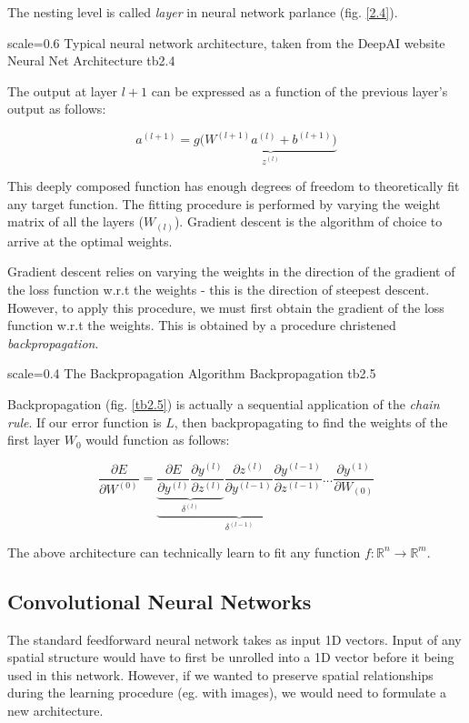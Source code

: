 The nesting level is called \emph{layer} in neural network parlance (fig. \ref{2.4}). 

{scale=0.6}%
{Typical neural network architecture, taken from the DeepAI website}%
{Neural Net Architecture}%
{tb2.4} %

The output at layer $l+1$ can be expressed as a function of the previous layer's output as follows:

\[a^{(l+1)} = g(\underbrace{W^{(l+1)}a^{(l)} + b^{(l+1)})}_{z^{(l)}}\]

This deeply composed function has enough degrees of freedom to theoretically fit any target function. The fitting procedure is performed by varying the weight matrix of all the layers ($W_{(l)}$). Gradient descent is the algorithm of choice to arrive at the optimal weights.

Gradient descent relies on varying the weights in the direction of the gradient of the loss function w.r.t the weights - this is the direction of steepest descent. However, to apply this procedure, we must first obtain the gradient of the loss function w.r.t the weights. This is obtained by a procedure christened \emph{backpropagation}.

{scale=0.4}%
{The Backpropagation Algorithm}%
{Backpropagation}%
{tb2.5} %

Backpropagation (fig. \ref{tb2.5}) is actually a sequential application of the \emph{chain rule}. 
If our error function is $L$, then backpropagating to find the weights of the first layer $W_0$ would function as follows:

\[\frac{\partial E}{\partial W^{(0)}} =  \underbrace{\underbrace{\frac{\partial E}{\partial y^{(l)}} \frac{\partial y^{(l)}}{\partial z^{(l)}}}_{\delta^{(l)}} \frac{\partial z^{(l)}}{\partial y^{(l-1)}} \frac{\partial y^{(l-1)}}{\partial z^{(l-1)}}}_{\delta^{(l-1)}} \dots \frac{\partial y^{(1)}}{\partial W_{(0)}}\]

The above architecture can technically learn to fit any function 
$f: \mathbb{R}^n \rightarrow \mathbb{R}^m $.

\subsection{Convolutional Neural Networks}
The standard feedforward neural network takes as input 1D vectors. Input of any spatial structure would have to first be unrolled into a 1D vector before it being used in this network. However, if we wanted to preserve spatial relationships during the learning procedure (eg. with images), we would need to formulate a new architecture.

